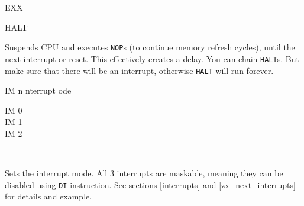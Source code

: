 \begin{basedescript}{
    \desclabelstyle{\multilinelabel}
    \desclabelwidth{3cm}}
\begin{DetailItem}{EXX}
        \begin{DetailTiming}
        \end{DetailTiming}

    \end{DetailItem}

    \pagebreak
    \begin{DetailItem}{HALT}
        {}
        {}

        Suspends CPU and executes {\tt NOP}s (to continue memory refresh cycles), until the next interrupt or reset. This effectively creates a delay. You can chain {\tt HALT}s. But make sure that there will be an interrupt, otherwise {\tt HALT} will run forever.

        \begin{DetailEffects}
            \FlagsHALT
        \end{DetailEffects}
						
        \begin{DetailTiming}
        \end{DetailTiming}

    \end{DetailItem}

    \begin{DetailItem}{IM n}
        {nterrupt ode}
        {}

        \begin{DetailVariants}[2]
            IM 0\\
            IM 1\\
            IM 2
			
            \columnbreak
            ~
        \end{DetailVariants}

        Sets the interrupt mode. All 3 interrupts are maskable, meaning they can be disabled using {\tt DI} instruction. See sections \ref{interrupts} and \ref{zx_next_interrupts} for details and example.

        \begin{DetailEffects}
            \FlagsIM		
        \end{DetailEffects}

        \begin{DetailTiming}
        \end{DetailTiming}

    \end{DetailItem}


\end{basedescript}
